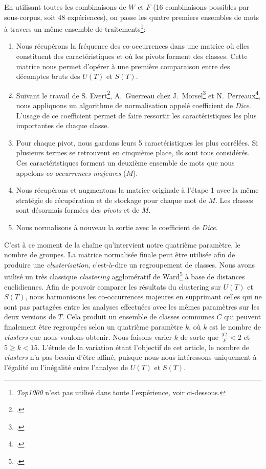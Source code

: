 En utilisant toutes les combinaisons de $W$ et $F$ (16 combinaisons possibles par sous-corpus, soit 48 expériences), on passe les quatre premiers ensembles de mots à travers un même ensemble de traitements\footnote{\textit{Top1000} n'est pas utilisé dans toute l'expérience, voir ci-dessous.}:
\begin{enumerate}
    \item Nous récupérons la fréquence des co-occurrences dans une matrice où elles constituent des caractéristiques et où les pivots forment des classes. Cette matrice nous permet d'opérer à une première comparaison entre des décomptes bruts des $U(T)$ et $S(T)$.
    \item Suivant le travail de S. Evert\footcite{evert2005statistics}, A.~Guerreau chez J.~Morsel\footcite{morsel:guerreau} et N.~Perreaux\footcite{perreaux:cbma}, nous appliquons un algorithme de normalisation appelé coefficient de \textit{Dice}. L'usage de ce coefficient permet de faire ressortir les caractéristiques les plus importantes de chaque classe.
    \item Pour chaque pivot, nous gardons leurs 5 caractéristiques les plus corrélées. Si plusieurs termes se retrouvent en cinquième place, ils sont tous considérés. Ces caractéristiques forment un deuxième ensemble de mots que nous appelons \textit{co-occurrences majeures} ($M$).
    \item Nous récupérons et augmentons la matrice originale à l'étape 1 avec la même stratégie de récupération et de stockage pour chaque mot de $M$. Les classes sont désormais formées des \textit{pivots} et de $M$.
    \item Nous normalisons à nouveau la sortie avec le coefficient de \textit{Dice}.
\end{enumerate}

C'est à ce moment de la chaîne qu'intervient notre quatrième paramètre, le nombre de groupes. La matrice normalisée finale peut être utilisée afin de produire une \textit{clusterisation}, c'est-à-dire un regroupement de classes. Nous avons utilisé un très classique \textit{clustering} agglomératif de Ward\footcite{ward1963hierarchical} à base de distances euclidiennes. Afin de pouvoir comparer les résultats du clustering sur $U(T)$ et $S(T)$, nous harmonisons les co-occurrences majeures en supprimant celles qui ne sont pas partagées entre les analyses effectuées avec les mêmes paramètres sur les deux versions de $T$. Cela produit un ensemble de classes communes $C$ qui peuvent finalement être regroupées selon un quatrième paramètre $k$, où $k$ est le nombre de \textit{clusters} que nous voulons obtenir. Nous faisons varier $k$ de sorte que $\frac{\left | C \right |}{k} < 2$ et $5 \geq k < 15$. L'étude de la variation étant l'objectif de cet article, le nombre de \textit{clusters} n'a pas besoin d'être affiné, puisque nous nous intéressons uniquement à l'égalité ou l'inégalité entre l'analyse de $U(T)$ et $S(T)$.


